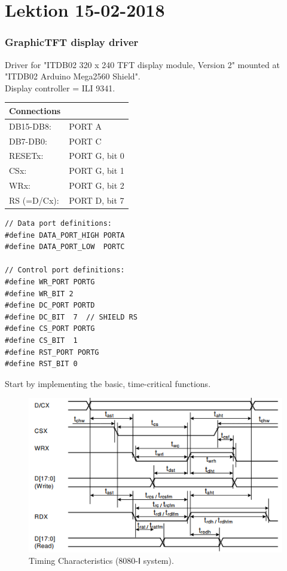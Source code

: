 \section{Lektion 15-02-2018}
\subsubsection{GraphicTFT display driver}

Driver for "ITDB02 320 x 240 TFT display module, Version 2" mounted at "ITDB02 Arduino Mega2560 Shield".\\

\noindent Display controller = ILI 9341.\\

\begin{tabular}{ll}
	\textbf{Connections}\\
	\hline
	\rule{0pt}{5mm}  
	DB15-DB8:   & PORT A\\ 
	\rule{0pt}{5mm}
	DB7-DB0:    & PORT C\\ 
	\rule{0pt}{5mm}
	RESETx:     & PORT G, bit 0\\ 
	\rule{0pt}{5mm}
	CSx:        & PORT G, bit 1\\ 
	\rule{0pt}{5mm}
	WRx:        & PORT G, bit 2\\ 
	\rule{0pt}{5mm}
	RS (=D/Cx): & PORT D, bit 7\\ 
\end{tabular} 

\begin{verbatim}
// Data port definitions:
#define DATA_PORT_HIGH PORTA
#define DATA_PORT_LOW  PORTC

// Control port definitions:
#define WR_PORT PORTG
#define WR_BIT 2
#define DC_PORT PORTD
#define DC_BIT  7  // SHIELD RS
#define CS_PORT PORTG
#define CS_BIT  1
#define RST_PORT PORTG
#define RST_BIT 0
\end{verbatim}
Start by implementing the basic, time-critical functions.

\begin{figure} [H]
	\centering
	\includegraphics[width=0.8\linewidth]{graphics/LAB3a.png}
	\caption{Timing Characteristics (8080-Ⅰ system).}
	\label{fig:11}
\end{figure}

